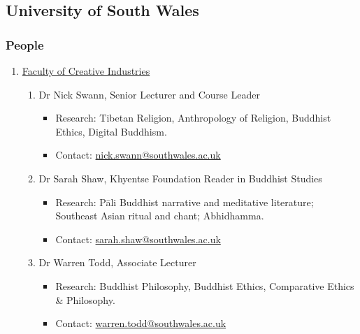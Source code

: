 \documentclass[a4paper,10.5pt]{article}
\begin{document}
\subsection{University of South Wales}
\label{sec:org4a51fd4}
\subsubsection{People}
\label{sec:orgf5604f5}
\begin{enumerate}
\item \href{https://www.southwales.ac.uk/courses/faculty/FCI/?faculty\_title=Faculty+of+Creative+Industries}{Faculty of Creative Industries}
\label{sec:orga62ec6f}
\begin{enumerate}
\item Dr Nick Swann, Senior Lecturer and Course Leader
\label{sec:orgc4b07bc}
\begin{itemize}
\item Research: Tibetan Religion, Anthropology of Religion, Buddhist Ethics, Digital Buddhism.\\
\item Contact: \href{mailto:nick.swann@southwales.ac.uk}{nick.swann@southwales.ac.uk}\\
\end{itemize}
\item Dr Sarah Shaw, Khyentse Foundation Reader in Buddhist Studies
\label{sec:orgb27a855}
\begin{itemize}
\item Research: Pāli Buddhist narrative and meditative literature; Southeast Asian ritual and chant; Abhidhamma.\\
\item Contact: \href{mailto:sarah.shaw@southwales.ac.uk}{sarah.shaw@southwales.ac.uk}\\
\end{itemize}
\item Dr Warren Todd, Associate Lecturer
\label{sec:org8f6cb69}
\begin{itemize}
\item Research: Buddhist Philosophy, Buddhist Ethics, Comparative Ethics \& Philosophy.\\
\item Contact: \href{mailto:warren.todd@southwales.ac.uk}{warren.todd@southwales.ac.uk}\\
\end{itemize}
\end{enumerate}
\end{enumerate}
\end{document}
